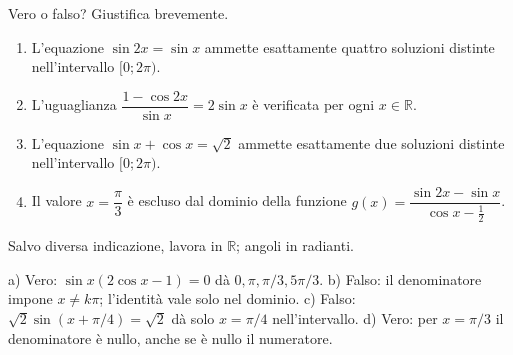 
\begin{esercizio}
Vero o falso? Giustifica brevemente. 

\begin{enumerate}
\item L'equazione $\sin 2x=\sin x$ ammette esattamente quattro
soluzioni distinte nell'intervallo $[0;2\pi)$. 

\item L'uguaglianza $\dfrac{1-\cos 2x}{\sin x}=2\sin x$
è verificata per ogni $x\in\mathbb{R}$. 

\item L'equazione $\sin x+\cos x=\sqrt{2}$ ammette esattamente
due soluzioni distinte nell'intervallo $[0;2\pi)$. 

\item Il valore $x=\dfrac{\pi}{3}$ è escluso dal dominio della funzione
$g(x)=\dfrac{\sin 2x-\sin x}{\cos x-\frac12}$. 
\end{enumerate}
Salvo diversa indicazione, lavora in $\mathbb R$; angoli in radianti.
\end{esercizio}

\begin{soluzione}
a) Vero: $\sin x(2\cos x-1)=0$ dà $0,\pi,\pi/3,5\pi/3$.
b) Falso: il denominatore impone $x\ne k\pi$; l'identità vale solo nel dominio.
c) Falso: $\sqrt2\sin(x+\pi/4)=\sqrt2$ dà solo $x=\pi/4$ nell'intervallo.
d) Vero: per $x=\pi/3$ il denominatore è nullo, anche se è nullo il numeratore.
\end{soluzione}
